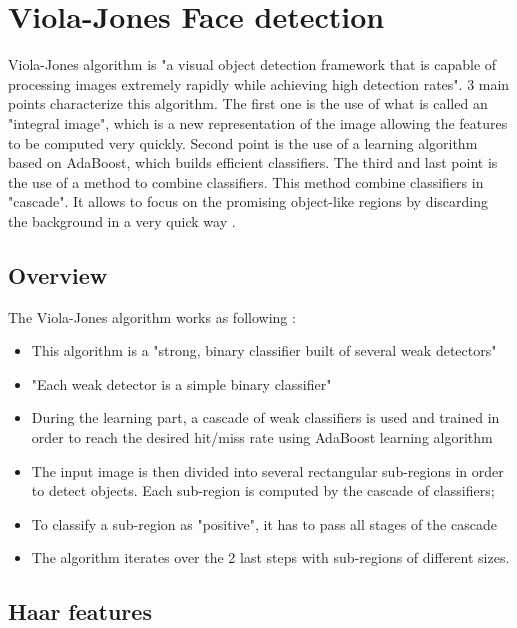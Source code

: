 \chapter{Viola-Jones Face detection}
\label{chap:vj}

\noindent Viola-Jones algorithm is "a visual object detection framework that is capable of processing images extremely rapidly while achieving high detection rates". 3 main points characterize this algorithm. The first one is the use of what is called an "integral image", which is a new representation of the image allowing the features to be computed very quickly. Second point is the use of a learning algorithm based on AdaBoost, which builds efficient classifiers. The third and last point is the use of a method to combine classifiers. This method combine classifiers in "cascade". It allows to focus on the promising object-like regions by discarding the background in a very quick way \cite{VIO01}.
\newline

\section{Overview}

\vspace{\baselineskip}
\noindent The Viola-Jones algorithm works as following \cite{DIN08}:

\begin{itemize}
  \item This algorithm is a "strong, binary classifier built of several weak detectors"
  \item "Each weak detector is a simple binary classifier"
  \item During the learning part, a cascade of weak classifiers is used and trained in order to reach the desired hit/miss rate using AdaBoost learning algorithm
  \item The input image is then divided into several rectangular sub-regions in order to detect objects. Each sub-region is computed by the cascade of classifiers;
  \item To classify a sub-region as "positive", it has to pass all stages of the cascade
  \item The algorithm iterates over the 2 last steps with sub-regions of different sizes.
\end{itemize}

\section{Haar features}

